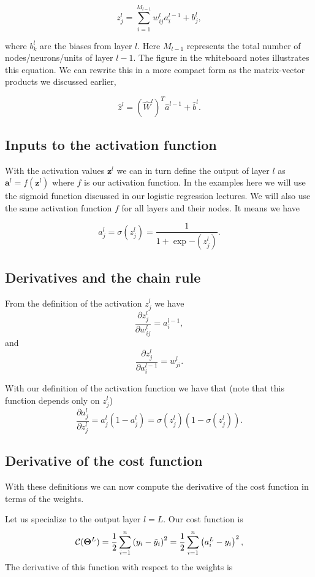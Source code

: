 \documentclass[%
oneside,                 %
final,                   %
10pt]{article}
\begin{document}
\[
z_j^l = \sum_{i=1}^{M_{l-1}}w_{ij}^la_i^{l-1}+b_j^l,
\]

where $b_k^l$ are the biases from layer $l$.  Here $M_{l-1}$
represents the total number of nodes/neurons/units of layer $l-1$. The
figure in the whiteboard notes illustrates this equation.  We can rewrite this in a more
compact form as the matrix-vector products we discussed earlier,

\[
\hat{z}^l = \left(\hat{W}^l\right)^T\hat{a}^{l-1}+\hat{b}^l.
\]

\subsection{Inputs to the activation function}

With the activation values $\bm{z}^l$ we can in turn define the
output of layer $l$ as $\bm{a}^l = f(\bm{z}^l)$ where $f$ is our
activation function. In the examples here we will use the sigmoid
function discussed in our logistic regression lectures. We will also use the same activation function $f$ for all layers
and their nodes.  It means we have

\[
a_j^l = \sigma(z_j^l) = \frac{1}{1+\exp{-(z_j^l)}}.
\]

\subsection{Derivatives and the chain rule}

From the definition of the activation $z_j^l$ we have
\[
\frac{\partial z_j^l}{\partial w_{ij}^l} = a_i^{l-1},
\]
and
\[
\frac{\partial z_j^l}{\partial a_i^{l-1}} = w_{ji}^l. 
\]

With our definition of the activation function we have that (note that this function depends only on $z_j^l$)
\[
\frac{\partial a_j^l}{\partial z_j^{l}} = a_j^l(1-a_j^l)=\sigma(z_j^l)(1-\sigma(z_j^l)). 
\]

\subsection{Derivative of the cost function}

With these definitions we can now compute the derivative of the cost function in terms of the weights.

Let us specialize to the output layer $l=L$. Our cost function is
\[
{\cal C}(\bm{\Theta}^L)  =  \frac{1}{2}\sum_{i=1}^n\left(y_i - \tilde{y}_i\right)^2=\frac{1}{2}\sum_{i=1}^n\left(a_i^L - y_i\right)^2, 
\]
The derivative of this function with respect to the weights is
\end{document}

